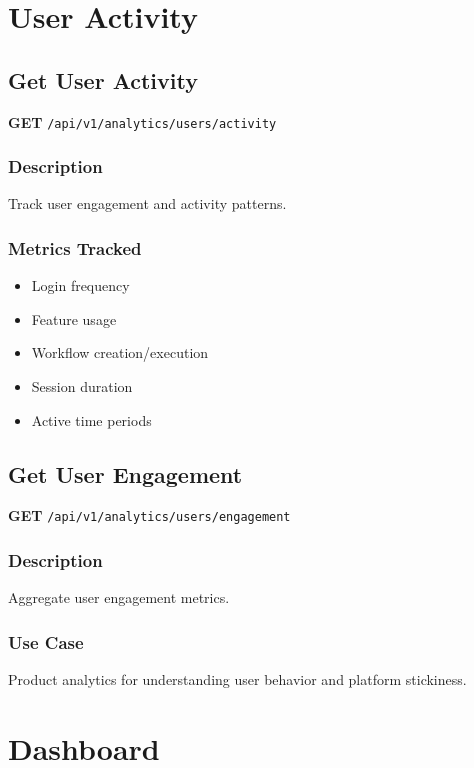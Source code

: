 \documentclass[11pt,a4paper]{report}
\begin{document}
\section{User Activity}

\subsection{Get User Activity}

\textbf{GET} \texttt{/api/v1/analytics/users/activity}

\subsubsection{Description}
Track user engagement and activity patterns.

\subsubsection{Metrics Tracked}
\begin{itemize}[leftmargin=*]
    \item Login frequency
    \item Feature usage
    \item Workflow creation/execution
    \item Session duration
    \item Active time periods
\end{itemize}

\subsection{Get User Engagement}

\textbf{GET} \texttt{/api/v1/analytics/users/engagement}

\subsubsection{Description}
Aggregate user engagement metrics.

\subsubsection{Use Case}
Product analytics for understanding user behavior and platform stickiness.

\section{Dashboard}
\end{document}
